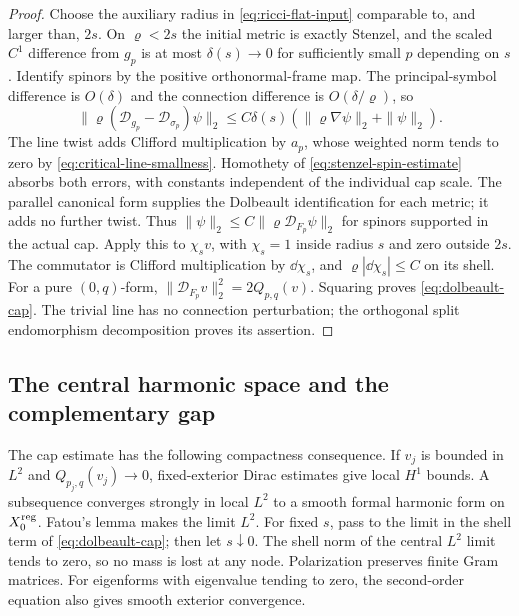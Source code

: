 \begin{proof}
Choose the auxiliary radius in
\eqref{eq:ricci-flat-input} comparable to, and larger than,
$2s$. On $\varrho<2s$ the initial metric is exactly
Stenzel, and the scaled $C^1$ difference from $g_p$ is at
most $\delta(s)\to0$ for sufficiently small $p$ depending
on $s$. Identify spinors by the positive orthonormal-frame
map. The principal-symbol difference is $O(\delta)$ and
the connection difference is $O(\delta/\varrho)$, so
\[
 \|\varrho(\mathcal D_{g_p}-\mathcal D_{\sigma_p})\psi\|_2
 \le C\delta(s)(\|\varrho\nabla\psi\|_2+\|\psi\|_2).
\]
The line twist adds Clifford multiplication by $a_p$,
whose weighted norm tends to zero by
\eqref{eq:critical-line-smallness}. Homothety of
\eqref{eq:stenzel-spin-estimate} absorbs both errors,
with constants independent of the individual cap scale.
The parallel canonical form supplies the Dolbeault
identification for each metric; it adds no further twist.
Thus $\|\psi\|_2\le C\|\varrho\mathcal D_{F_p}\psi\|_2$
for spinors supported in the actual cap.
Apply this to $\chi_s v$, with $\chi_s=1$ inside radius
$s$ and zero outside $2s$. The commutator is Clifford
multiplication by $\dd\chi_s$, and
$\varrho|\dd\chi_s|\le C$ on its shell.
For a pure $(0,q)$-form,
$\|\mathcal D_{F_p}v\|_2^2=2Q_{p,q}(v)$.
Squaring proves \eqref{eq:dolbeault-cap}. The trivial line
has no connection perturbation; the orthogonal split
endomorphism decomposition proves its assertion.
\end{proof}

\subsection{The central harmonic space and the complementary gap}

The cap estimate has the following compactness consequence.
If $v_j$ is bounded in $L^2$ and $Q_{p_j,q}(v_j)\to0$,
fixed-exterior Dirac estimates give local $H^1$ bounds.
A subsequence converges strongly in local $L^2$ to a smooth
formal harmonic form on $X_0^{\rm reg}$. Fatou's lemma
makes the limit $L^2$. For fixed $s$, pass to the limit
in the shell term of \eqref{eq:dolbeault-cap}; then let
$s\downarrow0$. The shell norm of the central $L^2$ limit
tends to zero, so no mass is lost at any node. Polarization
preserves finite Gram matrices. For eigenforms with
eigenvalue tending to zero, the second-order equation also
gives smooth exterior convergence.

